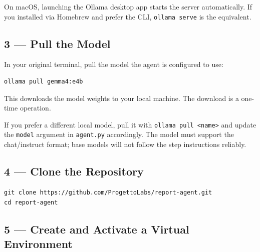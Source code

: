 \documentclass[12pt, a4paper]{article}
\begin{document}
\begin{notebox}
On macOS, launching the Ollama desktop app starts the server automatically. If you installed via Homebrew and prefer the CLI, \texttt{ollama serve} is the equivalent.
\end{notebox}

\subsection{3 --- Pull the Model}

In your original terminal, pull the model the agent is configured to use:

\begin{lstlisting}[style=shellstyle]
ollama pull gemma4:e4b
\end{lstlisting}

This downloads the model weights to your local machine. The download is a one-time operation.

\begin{notebox}
If you prefer a different local model, pull it with \texttt{ollama pull <name>} and update the \texttt{model} argument in \texttt{agent.py} accordingly. The model must support the chat/instruct format; base models will not follow the step instructions reliably.
\end{notebox}

\subsection{4 --- Clone the Repository}

\begin{lstlisting}[style=shellstyle]
git clone https://github.com/ProgettoLabs/report-agent.git
cd report-agent
\end{lstlisting}

\subsection{5 --- Create and Activate a Virtual Environment}
\end{document}
